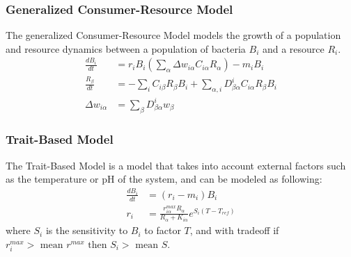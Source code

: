 \subsubsection{Generalized Consumer-Resource Model}
The generalized Consumer-Resource Model models the growth of a population and resource dynamics between a population of bacteria ${B}_i$ and a resource ${R}_i$. 
\begin{align}
    \frac{d{B}_i}{dt} &= r_i{B}_i \left(\sum_{\alpha} \Delta w_{i \alpha}C_{i \alpha}R_{\alpha}\right) - m_i {B}_i \\
    \frac{R_{\beta}}{dt} &= -\sum_i C_{i\beta}R_{\beta}{B_i} + \sum_{\alpha, i}D_{\beta\alpha}^{i}C_{i\alpha}R_{\beta}{B}_i \\
    \Delta w_{i\alpha} &= \sum_{\beta}D_{\beta \alpha}^{i}w_{\beta}
\end{align}

\subsubsection{Trait-Based Model}
The Trait-Based Model is a model that takes into account external factors such as the temperature or pH of the system, and can be modeled as following:  
\begin{align}
    \frac{dB_i}{dt} &= \left(r_i - m_i\right) B_i \\
    r_i &= \frac{r_{i\alpha}^{max}R_\alpha}{R_\alpha + K_{i\alpha}}e^{S_i\left(T-T_{ref}\right)}
\end{align}
where $S_i$ is the sensitivity to $B_i$ to factor $T$, and with tradeoff if $r_i^{max} > \text{ mean } r^{max} \text{ then } S_i > \text{ mean } S$. 

